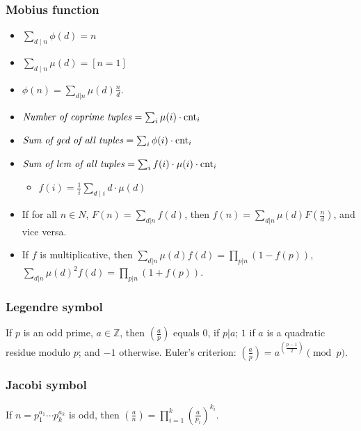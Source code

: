 {\subsubsection{Mobius function}
\begin{itemize}[leftmargin=*, noitemsep]
  \item $\sum_{d \mid n} \phi(d) = n$
  \item $\sum_{d \mid n} \mu(d) = [n = 1]$
  \item $\phi(n) = \sum_{d|n} \mu(d) \frac{n}{d}$.
  \item $\text{\emph{Number of coprime tuples}} = \sum_{i} \mu(i) \cdot \text{cnt}_i$
  \item $\text{\emph{Sum of gcd of all tuples}} = \sum_{i} \phi(i) \cdot \text{cnt}_i$
  \item $\text{\emph{Sum of lcm of all tuples}} = \sum_{i} f(i) \cdot \mu(i) \cdot \text{cnt}_i$
  \begin{itemize}[leftmargin=0.5cm, noitemsep]
    \item $f(i) = \frac{1}{i} \sum_{d \mid i} d \cdot \mu(d)$
  \end{itemize}
  \item If for all $n \in N$, $F(n)=\sum_{d|n} f(d)$, then $f(n) = \sum_{d|n} \mu(d) F(\frac{n}{d})$, and vice versa.
  \item If $f$ is multiplicative, then $\sum_{d|n} \mu(d) f(d) = \prod_{p|n}(1-f(p))$,
  $\sum_{d|n} \mu(d)^2 f(d) = \prod_{p|n} (1+f(p))$.
\end{itemize}

\subsubsection{Legendre symbol} If $p$ is an odd prime, $a \in {\mathbb Z}$, then
$\left(\frac{a}{p}\right)$ equals $0$, if $p | a$; $1$ if $a$ is a quadratic
residue modulo $p$; and $-1$ otherwise.
Euler's criterion:
$\left(\frac{a}{p}\right)=a^{\left(\frac{p-1}{2}\right)} \pmod p$. \\
\subsubsection{Jacobi symbol}  %
If $n=p_1^{a_1} \cdots p_k^{a_k}$ is odd, then
$\left(\frac{a}{n}\right) = \prod_{i=1}^k \left(\frac{a}{p_i}\right)^{k_i}$.

}
